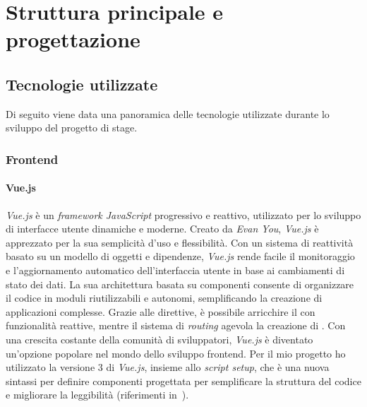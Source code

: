 \chapter{Struttura principale e progettazione}\label{cap:struttura-progettazione}


\section{Tecnologie utilizzate}\label{sec:tecnologie-utilizzate}
Di seguito viene data una panoramica delle tecnologie utilizzate durante lo sviluppo del progetto di stage.

\subsection{Frontend}\label{subsec:frontend}
\subsubsection{Vue.js}\label{subsubsec:vue-js}
\textit{Vue.js} è un \textit{framework JavaScript} progressivo e reattivo, utilizzato per lo sviluppo di interfacce utente dinamiche e moderne. 
Creato da \textit{Evan You}, \textit{Vue.js} è apprezzato per la sua semplicità d'uso e flessibilità. Con un sistema di reattività basato su un modello di oggetti e dipendenze, 
\textit{Vue.js} rende facile il monitoraggio e l'aggiornamento automatico dell'interfaccia utente in base ai cambiamenti di stato dei dati. La sua architettura basata 
su componenti consente di organizzare il codice in moduli riutilizzabili e autonomi, semplificando la creazione di applicazioni complesse. 
Grazie alle direttive, è possibile arricchire il  con funzionalità reattive, mentre il sistema di \textit{routing} agevola la creazione di . 
Con una crescita costante della comunità di sviluppatori, \textit{Vue.js} è diventato un'opzione popolare nel mondo dello sviluppo frontend.
Per il mio progetto ho utilizzato la versione 3 di \textit{Vue.js}, insieme allo \textit{script setup}, che è una nuova sintassi per definire componenti progettata per semplificare la struttura del codice e migliorare la leggibilità (riferimenti in~\cite{site:vue.js}).


